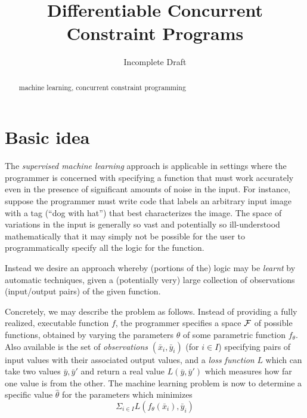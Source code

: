 \documentclass{llncs}
\newcommand{\keywords}[1]{\par\addvspace\baselineskip
\noindent\keywordname\enspace\ignorespaces#1}
\begin{document}
%

\long{}

\title{Differentiable Concurrent Constraint Programs}

\author{{\sc Incomplete Draft}}
\institute{}
\maketitle

\begin{abstract}

\keywords{machine learning, concurrent constraint programming}
\end{abstract}
\section{Basic idea}

The {\em supervised machine learning} approach is applicable in
settings where the programmer is concerned with specifying a function
that must work accurately even in the presence of significant amounts
of noise in the input. For instance, suppose the programmer must write
code that labels an arbitrary input image with a tag (``dog with
hat'') that best characterizes the image. The space of variations in
the input is generally so vast and potentially so ill-understood
mathematically that it may simply not be possible for the user to
programmatically specify all the logic for the function.

Instead we desire an approach whereby (portions of the) logic may be
{\em learnt} by automatic techniques, given a (potentially very) large
collection of observations (input/output pairs) of the given
function. 

Concretely, we may describe the problem as follows. Instead of
providing a fully realized, executable function $f$, the programmer
specifies a space $\cal F$ of possible 
functions, obtained by varying the parameters $\theta$ of
some parametric function $f_{\theta}$.  Also
available is the set of {\em observations}
$(\bar{x}_i, \bar{y}_i)$ (for $i\in I$) specifying pairs of input values with their
associated output values, and a {\em loss function} $L$ which can take
two values $\bar{y},\bar{y}'$ and return a real value 
$L(\bar{y},\bar{y}')$ which measures how far one value is from the
other. The machine learning problem is now to determine a specific
value $\hat{\theta}$ for the parameters which minimizes
$$\Sigma_{i \in I} L(f_\theta(\bar{x}_i), \bar{y}_i)$$
\end{document}
